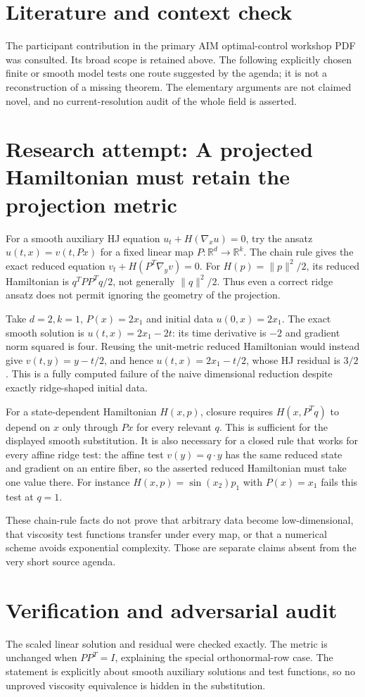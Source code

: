 \documentclass[11pt]{article}
\begin{document}
\section{Literature and context check}
The participant contribution in the primary AIM optimal-control workshop
 PDF was consulted. Its broad scope is retained above. The following explicitly
 chosen finite or smooth model tests one route suggested by the agenda; it is
 not a reconstruction of a missing theorem. The elementary arguments are not
 claimed novel, and no current-resolution audit of the whole field is asserted.
\section{Research attempt: A projected Hamiltonian must retain the projection metric}
For a smooth auxiliary HJ equation $u_t+H(\nabla_xu)=0$, try the ansatz
$u(t,x)=v(t,Px)$ for a fixed linear map $P:\mathbb R^d\to\mathbb R^k$.
The chain rule gives the exact reduced equation
$v_t+H(P^T\nabla_yv)=0$. For $H(p)=\|p\|^2/2$, its reduced Hamiltonian is
$q^TPP^Tq/2$, not generally $\|q\|^2/2$. Thus even a correct ridge ansatz
does not permit ignoring the geometry of the projection.

Take $d=2,k=1$, $P(x)=2x_1$ and initial data $u(0,x)=2x_1$.
The exact smooth solution is $u(t,x)=2x_1-2t$: its time derivative is $-2$
and gradient norm squared is four. Reusing the unit-metric reduced Hamiltonian
would instead give $v(t,y)=y-t/2$, and hence $u(t,x)=2x_1-t/2$, whose HJ
residual is $3/2$. This is a fully computed failure of the naive dimensional
reduction despite exactly ridge-shaped initial data.

For a state-dependent Hamiltonian $H(x,p)$, closure requires
$H(x,P^Tq)$ to depend on $x$ only through $Px$ for every relevant $q$.
This is sufficient for the displayed smooth substitution. It is also necessary
for a closed rule that works for every affine ridge test: the affine test
$v(y)=q\cdot y$ has the same reduced state and gradient on an entire fiber,
so the asserted reduced Hamiltonian must take one value there. For instance
$H(x,p)=\sin(x_2)p_1$ with $P(x)=x_1$ fails this test at $q=1$.

These chain-rule facts do not prove that arbitrary data become low-dimensional,
that viscosity test functions transfer under every map, or that a numerical
scheme avoids exponential complexity. Those are separate claims absent from
the very short source agenda.
\section{Verification and adversarial audit}
The scaled linear solution and residual were checked exactly. The metric
is unchanged when $PP^T=I$, explaining the special orthonormal-row case.
The statement is explicitly about smooth auxiliary solutions and test functions,
so no unproved viscosity equivalence is hidden in the substitution.
\end{document}
